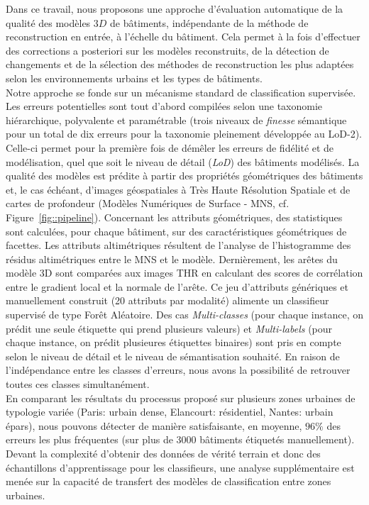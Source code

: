\documentclass[a4paper,french]{article}
\begin{document}
        Dans ce travail, nous proposons une approche d'évaluation automatique de la qualité des modèles $3D$ de bâtiments, indépendante de la méthode de reconstruction en entrée, à l'échelle du bâtiment. Cela permet à la fois d'effectuer des corrections a posteriori sur les modèles reconstruits, de la détection de changements et de la sélection des méthodes de reconstruction les plus adaptées selon les environnements urbains et les types de bâtiments.\\
        
        Notre approche se fonde sur un mécanisme standard de classification supervisée. Les erreurs potentielles sont tout d'abord compilées selon une taxonomie hiérarchique, polyvalente et paramétrable (trois niveaux de \textit{finesse} sémantique pour un total de dix erreurs pour la taxonomie pleinement développée au LoD-2). Celle-ci permet pour la première fois de démêler les erreurs de fidélité et de modélisation, quel que soit le niveau de détail (\textit{LoD}) des bâtiments modélisés. La qualité des modèles est prédite à partir des propriétés géométriques des bâtiments et, le cas échéant, d'images géospatiales à Très Haute Résolution Spatiale et de cartes de profondeur (Modèles Numériques de Surface - MNS, cf. Figure~\ref{fig::pipeline}). Concernant les attributs géométriques, des statistiques sont calculées, pour chaque bâtiment, sur des caractéristiques géométriques de facettes. Les attributs altimétriques résultent de l'analyse de l'histogramme des résidus altimétriques entre le MNS et le modèle. Dernièrement, les arêtes du modèle 3D sont comparées aux images THR en calculant des scores de corrélation entre le gradient local et la normale de l'arête. Ce jeu d'attributs génériques et manuellement construit (20 attributs par modalité) alimente un classifieur supervisé de type Forêt Aléatoire. Des cas \textit{Multi-classes} (pour chaque instance, on prédit une seule étiquette qui prend plusieurs valeurs) et \textit{Multi-labels} (pour chaque instance, on prédit plusieures étiquettes binaires) sont pris en compte selon le niveau de détail et le niveau de sémantisation souhaité. En raison de l'indépendance entre les classes d'erreurs, nous avons la possibilité de retrouver toutes ces classes simultanément. \\
        
En comparant les résultats du processus proposé sur plusieurs zones urbaines de typologie variée (Paris: urbain dense, Elancourt: résidentiel, Nantes: urbain épars), nous pouvons détecter de manière satisfaisante, en moyenne, $96\%$ des erreurs les plus fréquentes (sur plus de 3000 bâtiments étiquetés manuellement). Devant la complexité d'obtenir des données de vérité terrain et donc des échantillons d'apprentissage pour les classifieurs, une analyse supplémentaire est menée sur la capacité de transfert des modèles de classification entre zones urbaines.\\



        
        \begin{spacing}{0.01}
            
        \end{spacing}
    
\end{document}
